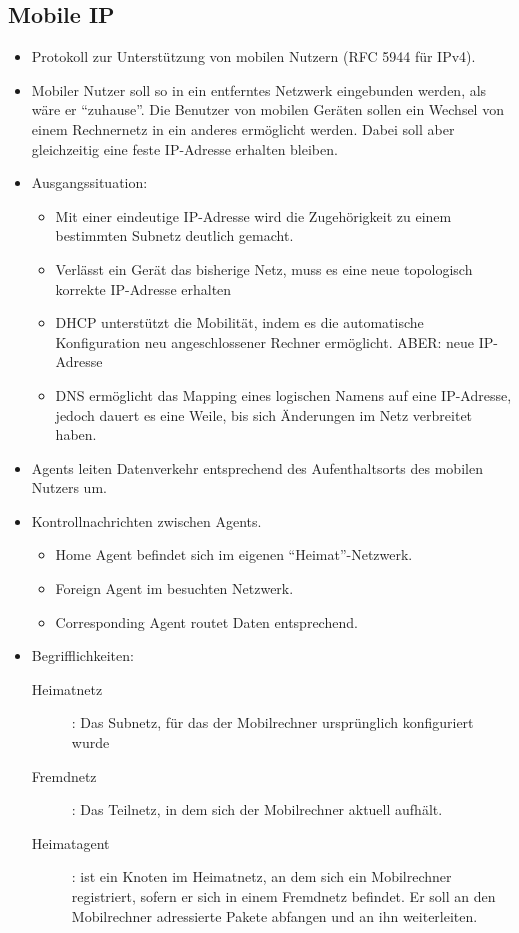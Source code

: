 \documentclass{article} %
\begin{document}
\subsection{Mobile IP}
	\begin{itemize}
	\item Protokoll zur Unterstützung von mobilen Nutzern (RFC 5944 für IPv4). 
	\item Mobiler Nutzer soll so in ein entferntes Netzwerk eingebunden werden, als wäre er "`zuhause"'. Die Benutzer von mobilen Geräten sollen ein Wechsel von einem Rechnernetz in ein anderes ermöglicht werden. Dabei soll aber gleichzeitig eine feste IP-Adresse erhalten bleiben.
	\item Ausgangssituation:
		\begin{itemize}
		\item Mit einer eindeutige IP-Adresse wird die Zugehörigkeit zu einem bestimmten Subnetz deutlich gemacht.
		\item Verlässt ein Gerät das bisherige Netz, muss es eine neue topologisch korrekte IP-Adresse erhalten
		\item DHCP unterstützt die Mobilität, indem es die automatische Konfiguration neu angeschlossener Rechner ermöglicht. ABER: neue IP-Adresse
		\item DNS ermöglicht das Mapping eines logischen Namens auf eine IP-Adresse, jedoch dauert es eine Weile, bis sich Änderungen im Netz verbreitet haben. 
		\end{itemize}
	\item Agents leiten Datenverkehr entsprechend des Aufenthaltsorts des mobilen Nutzers um. 
	\item Kontrollnachrichten zwischen Agents. 
		\begin{itemize}
		\item Home Agent befindet sich im eigenen "`Heimat"'-Netzwerk.
		\item Foreign Agent im besuchten Netzwerk. 
		\item Corresponding Agent routet Daten entsprechend. 
		\end{itemize}
	\item Begrifflichkeiten:
		\begin{description}
		\item[Heimatnetz]: Das Subnetz, für das der Mobilrechner ursprünglich konfiguriert wurde
		\item[Fremdnetz]: Das Teilnetz, in dem sich der Mobilrechner aktuell aufhält.
		\item[Heimatagent]: ist ein Knoten im Heimatnetz, an dem sich ein Mobilrechner registriert, sofern er sich in einem Fremdnetz befindet. Er soll an den Mobilrechner adressierte Pakete abfangen und an ihn weiterleiten.

\end{description}
\end{itemize}
\end{document}
